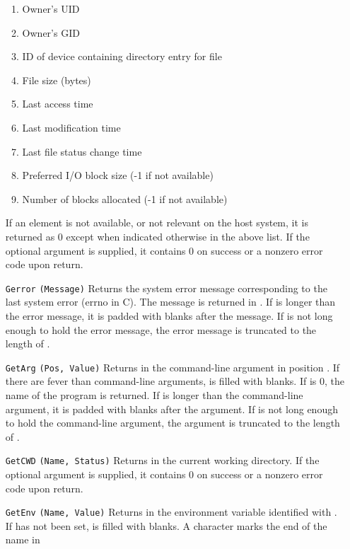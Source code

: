 \begin{itemize}
\begin{enumerate}
      \item Owner's UID 
      \item Owner's GID 
      \item ID of device containing directory entry for file
      \item File size (bytes) 
      \item Last access time 
      \item Last modification time 
      \item Last file status change time 
      \item Preferred I/O block size (-1 if not available) 
      \item Number of blocks allocated (-1 if not available)
    \end{enumerate}
    If an element is not available, or not relevant on the host system,
    it is returned as 0 except when indicated otherwise in the above list.
    If the optional  argument is supplied, it contains 0 on
    success or a nonzero error code upon return.
  \item[\tt Gerror]{\tt (Message)}
    Returns the system error message corresponding to the last system error
    (errno in C). The message is returned in .
    If  is longer than the error message, it is padded with
    blanks after the message.  If  is not long enough to hold
    the error message, the error message is truncated to the length of
    .
  \item[\tt GetArg]{\tt (Pos, Value)}
    Returns in  the command-line argument in position .
    If there are fever than  command-line arguments, 
    is filled with blanks.  If  is 0, the name of the program is
    returned.
    If  is longer than the command-line argument, it is padded
    with blanks after the argument.  If  is not long enough to
    hold the command-line argument, the argument is truncated to the length
    of .
  \item[\tt GetCWD]{\tt (Name, Status)}
    Returns in  the current working directory. If the optional
     argument is supplied, it contains 0 on success or a
    nonzero error code upon return.
  \item[\tt GetEnv]{\tt (Name, Value)}
    Returns in  the environment variable identified with
    .  If  has not been set,  is filled
    with blanks. A  character marks the end of the name in

\end{itemize}
